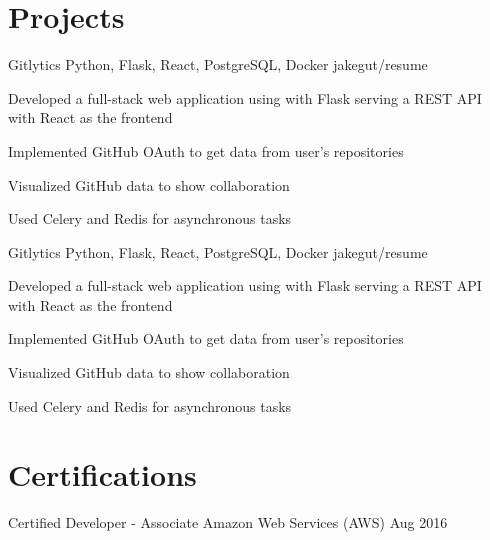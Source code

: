 \documentclass[letterpaper]{resume_config}
\begin{document}
\vspace{-10pt}

\section{Projects}

\Project
    {Gitlytics} %
    {Python, Flask, React, PostgreSQL, Docker} %
    {jakegut/resume} %
    {
        \item Developed a full-stack web application using with Flask serving a REST API with React as the frontend
        \item Implemented GitHub OAuth to get data from user’s repositories
        \item Visualized GitHub data to show collaboration
        \item Used Celery and Redis for asynchronous tasks
    }

\Project
    {Gitlytics} %
    {Python, Flask, React, PostgreSQL, Docker} %
    {jakegut/resume} %
    {
        \item Developed a full-stack web application using with Flask serving a REST API with React as the frontend
        \item Implemented GitHub OAuth to get data from user’s repositories
        \item Visualized GitHub data to show collaboration
        \item Used Celery and Redis for asynchronous tasks
    }

\vspace{-8pt}

\section{Certifications}

\Certification
    {Certified Developer - Associate} %
    {Amazon Web Services (AWS)} %
    {Aug 2016} %

\vspace{4pt}
\end{document}
